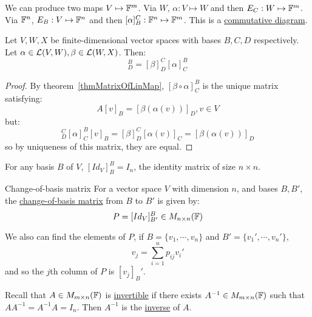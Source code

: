\documentclass[../Main.tex]{subfiles}
\begin{document}
\begin{remark}
    We can produce two maps $V \mapsto \mathbb{F}^m$. Via $W$, $\alpha : V \mapsto W$ and then $E_C : W \mapsto \mathbb{F}^m$. Via $\mathbb{F}^n$, $E_B : V \mapsto \mathbb{F}^n$ and then $[\alpha]_B^C : \mathbb{F}^n \mapsto \mathbb{F}^m$. This is a \underline{commutative diagram}.
\end{remark}
\begin{proposition}
    Let $V, W, X$ be finite-dimensional vector spaces with bases $B, C, D$ respectively. Let $\alpha \in \mathcal{L}(V,W), \beta \in \mathcal{L}(W, X)$. Then:
    \begin{equation*}
        [\beta \circ\alpha]_D^B =[\beta]_D^C [\alpha]_C^B
    \end{equation*}
    \label{propMatrixCompose}
\end{proposition}
\begin{proof}
    By theorem~\ref{thmMatrixOfLinMap}, $[\beta\circ\alpha]_C^B$ is the unique matrix satisfying:
    \begin{equation*}
        A[v]_B = [\beta(\alpha(v))]_D, v \in V
    \end{equation*}
    but:
    \begin{equation*}
        [\beta]_D^C[\alpha]_C^B[v]_B = [\beta]_D^C[\alpha(v)]_C = [\beta(\alpha(v))]_D
    \end{equation*}
    so by uniqueness of this matrix, they are equal.
\end{proof}
\begin{remark}
    For any basis $B$ of $V$, $[Id_V]_B^B = I_n$, the identity matrix of size $n\times n$.
\end{remark}
\begin{definition}{Change-of-basis matrix}
    For a vector space $V$ with dimension $n$, and bases $B, B'$, the \underline{change-of-basis matrix} from $B$ to $B'$ is given by:
    \begin{equation*}
        P = [Id_V]_{B'}^B \in M_{n \times n}(\mathbb{F})
    \end{equation*}
\end{definition}
We also can find the elements of $P$, if $B = \{v_1, \cdots, v_n\}$ and $B' = \{v_1', \cdots, v_n'\}$,
\begin{equation*}
    v_j = \sum_{i=1}^{n}p_{ij} v_i'
\end{equation*}
and so the $j$th column of $P$ is $[v_j]_B'$.

Recall that $A \in M_{m \times n}(\mathbb{F})$ is \underline{invertible} if there exists $A^{-1} \in M_{m \times n}(\mathbb{F})$ such that $A A^{-1} = A^{-1} A = I_n$. Then $A^{-1}$ is the \underline{inverse} of $A$.
\end{document}
